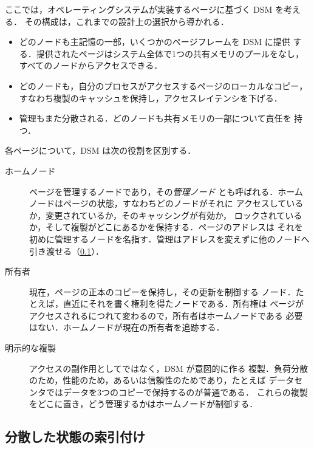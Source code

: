 \documentclass[../main.tex]{subfiles}
\begin{document}
ここでは，オペレーティングシステムが実装するページに基づく DSM を考える．
その構成は，これまでの設計上の選択から導かれる．
\begin{itemize}
  \item どのノードも主記憶の一部，いくつかのページフレームを DSM に提供
    する．提供されたページはシステム全体で1つの共有メモリのプールをなし，
    すべてのノードからアクセスできる．
  \item どのノードも，自分のプロセスがアクセスするページのローカルなコピー，
    すなわち複製のキャッシュを保持し，アクセスレイテンシを下げる．
  \item 管理もまた分散される．どのノードも共有メモリの一部について責任を
    持つ．
\end{itemize}
各ページについて，DSM は次の役割を区別する．
\begin{description}
  \item[ホームノード] ページを管理するノードであり，その\emph{管理ノード}
    とも呼ばれる．ホームノードはページの状態，すなわちどのノードがそれに
    アクセスしているか，変更されているか，そのキャッシングが有効か，
    ロックされているか，そして複製がどこにあるかを保持する．ページのアドレスは
    それを初めに管理するノードを名指す．管理はアドレスを変えずに他のノードへ
    引き渡せる（\cref{sec:l15-indexing}）．
  \item[所有者] 現在，ページの正本のコピーを保持し，その更新を制御する
    ノード．たとえば，直近にそれを書く権利を得たノードである．所有権は
    ページがアクセスされるにつれて変わるので，所有者はホームノードである
    必要はない．ホームノードが現在の所有者を追跡する．
  \item[明示的な複製] アクセスの副作用としてではなく，DSM が意図的に作る
    複製．負荷分散のため，性能のため，あるいは信頼性のためであり，たとえば
    データセンタではデータを3つのコピーで保持するのが普通である．
    これらの複製をどこに置き，どう管理するかはホームノードが制御する．
\end{description}

\subsection{分散した状態の索引付け}
\label{sec:l15-indexing}
\end{document}
